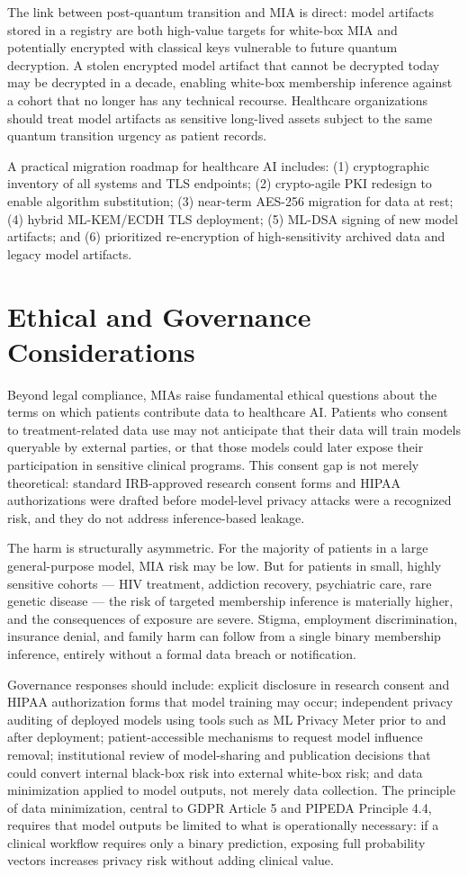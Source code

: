 \documentclass[conference]{IEEEtran}
\begin{document}
	The link between post-quantum transition and MIA is direct: model artifacts stored in a registry are both high-value targets for white-box MIA and potentially encrypted with classical keys vulnerable to future quantum decryption. A stolen encrypted model artifact that cannot be decrypted today may be decrypted in a decade, enabling white-box membership inference against a cohort that no longer has any technical recourse. Healthcare organizations should treat model artifacts as sensitive long-lived assets subject to the same quantum transition urgency as patient records.

	A practical migration roadmap for healthcare AI includes: (1) cryptographic inventory of all systems and TLS endpoints; (2) crypto-agile PKI redesign to enable algorithm substitution; (3) near-term AES-256 migration for data at rest; (4) hybrid ML-KEM/ECDH TLS deployment; (5) ML-DSA signing of new model artifacts; and (6) prioritized re-encryption of high-sensitivity archived data and legacy model artifacts.

	\section{Ethical and Governance Considerations}
	Beyond legal compliance, MIAs raise fundamental ethical questions about the terms on which patients contribute data to healthcare AI. Patients who consent to treatment-related data use may not anticipate that their data will train models queryable by external parties, or that those models could later expose their participation in sensitive clinical programs. This consent gap is not merely theoretical: standard IRB-approved research consent forms and HIPAA authorizations were drafted before model-level privacy attacks were a recognized risk, and they do not address inference-based leakage.

	The harm is structurally asymmetric. For the majority of patients in a large general-purpose model, MIA risk may be low. But for patients in small, highly sensitive cohorts --- HIV treatment, addiction recovery, psychiatric care, rare genetic disease --- the risk of targeted membership inference is materially higher, and the consequences of exposure are severe. Stigma, employment discrimination, insurance denial, and family harm can follow from a single binary membership inference, entirely without a formal data breach or notification.

	Governance responses should include: explicit disclosure in research consent and HIPAA authorization forms that model training may occur; independent privacy auditing of deployed models using tools such as ML Privacy Meter prior to and after deployment; patient-accessible mechanisms to request model influence removal; institutional review of model-sharing and publication decisions that could convert internal black-box risk into external white-box risk; and data minimization applied to model outputs, not merely data collection. The principle of data minimization, central to GDPR Article 5 and PIPEDA Principle 4.4, requires that model outputs be limited to what is operationally necessary: if a clinical workflow requires only a binary prediction, exposing full probability vectors increases privacy risk without adding clinical value.
\end{document}
